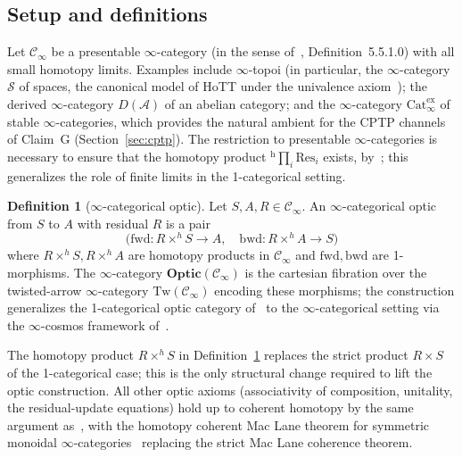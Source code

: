 \documentclass[11pt,a4paper]{article}
\theoremstyle{plain}
\theoremstyle{definition}
\newtheorem{definition}[theorem]{Definition}
\theoremstyle{remark}
\newcommand{\Optic}{\mathbf{Optic}}
\begin{document}
\subsection{Setup and definitions}

Let $\mathcal{C}_\infty$ be a presentable $\infty$-category (in the
sense of~\cite{lurie2009htt}, Definition~5.5.1.0) with all small
homotopy limits. Examples include $\infty$-topoi (in particular, the
$\infty$-category $\mathcal{S}$ of spaces, the canonical model of HoTT
under the univalence axiom~\cite{hottbook2013}); the derived
$\infty$-category $D(\mathcal{A})$ of an abelian category; and the
$\infty$-category $\mathrm{Cat}^{\mathrm{ex}}_\infty$ of stable
$\infty$-categories, which provides the natural ambient for the CPTP
channels of Claim~G (Section~\ref{sec:cptp}). The restriction to
presentable $\infty$-categories is necessary to ensure that the
homotopy product ${}^{\mathrm{h}}\!\prod_i \mathrm{Res}_i$ exists, by~\cite[Proposition
5.5.3.1]{lurie2009htt}; this generalizes the role of finite limits in
the 1-categorical setting.

\begin{definition}[$\infty$-categorical optic]
\label{def:hott-optic}
Let $S, A, R \in \mathcal{C}_\infty$. An $\infty$-categorical optic
from $S$ to $A$ with residual $R$ is a pair
\[
\bigl(\mathrm{fwd}: R \times^h S \to A, \quad
      \mathrm{bwd}: R \times^h A \to S\bigr)
\]
where $R \times^h S, R \times^h A$ are homotopy products in
$\mathcal{C}_\infty$ and $\mathrm{fwd}, \mathrm{bwd}$ are 1-morphisms.
The $\infty$-category $\Optic(\mathcal{C}_\infty)$ is the cartesian
fibration over the twisted-arrow $\infty$-category
$\mathrm{Tw}(\mathcal{C}_\infty)$ encoding these morphisms; the
construction generalizes the 1-categorical optic category
of~\cite{riley2018optics} to the $\infty$-categorical setting via the
$\infty$-cosmos framework of~\cite{riehlverity2022}.
\end{definition}

The homotopy product $R \times^h S$ in
Definition~\ref{def:hott-optic} replaces the strict product $R \times S$
of the 1-categorical case; this is the only structural change required
to lift the optic construction. All other optic axioms (associativity of
composition, unitality, the residual-update equations) hold up to
coherent homotopy by the same argument as~\cite[Proposition~2.3]
{riley2018optics}, with the homotopy coherent Mac Lane theorem for
symmetric monoidal $\infty$-categories~\cite[Theorem~2.4.3]
{lurie2017ha} replacing the strict Mac Lane coherence theorem.
\end{document}
